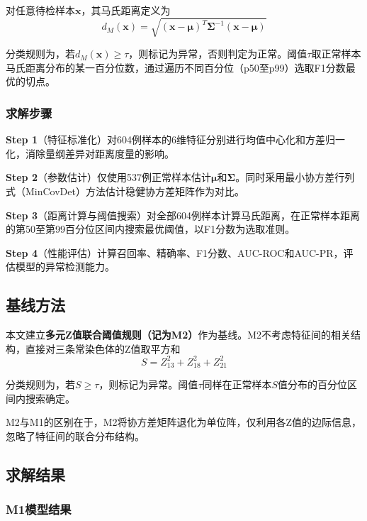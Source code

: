 对任意待检样本$\mathbf{x}$，其马氏距离定义为
\begin{equation}\label{eq:mahal}
  d_M(\mathbf{x}) = \sqrt{(\mathbf{x} - \boldsymbol{\mu})^T \boldsymbol{\Sigma}^{-1} (\mathbf{x} - \boldsymbol{\mu})}
\end{equation}

分类规则为，若$d_M(\mathbf{x}) \geq \tau$，则标记为异常，否则判定为正常。阈值$\tau$取正常样本马氏距离分布的某一百分位数，通过遍历不同百分位（p50至p99）选取F1分数最优的切点。

\subsubsection{求解步骤}

\textbf{Step 1}（特征标准化）\quad 对604例样本的6维特征分别进行均值中心化和方差归一化，消除量纲差异对距离度量的影响。

\textbf{Step 2}（参数估计）\quad 仅使用537例正常样本估计$\boldsymbol{\mu}$和$\boldsymbol{\Sigma}$。同时采用最小协方差行列式（MinCovDet）方法估计稳健协方差矩阵作为对比。

\textbf{Step 3}（距离计算与阈值搜索）\quad 对全部604例样本计算马氏距离，在正常样本距离的第50至第99百分位区间内搜索最优阈值，以F1分数为选取准则。

\textbf{Step 4}（性能评估）\quad 计算召回率、精确率、F1分数、AUC-ROC和AUC-PR，评估模型的异常检测能力。

\subsection{基线方法}

本文建立\textbf{多元Z值联合阈值规则（记为M2）}作为基线。M2不考虑特征间的相关结构，直接对三条常染色体的Z值取平方和
\begin{equation}\label{eq:zsquare}
  S = Z_{13}^2 + Z_{18}^2 + Z_{21}^2
\end{equation}

分类规则为，若$S \geq \tau$，则标记为异常。阈值$\tau$同样在正常样本$S$值分布的百分位区间内搜索确定。

M2与M1的区别在于，M2将协方差矩阵退化为单位阵，仅利用各Z值的边际信息，忽略了特征间的联合分布结构。

\subsection{求解结果}

\subsubsection{M1模型结果}

